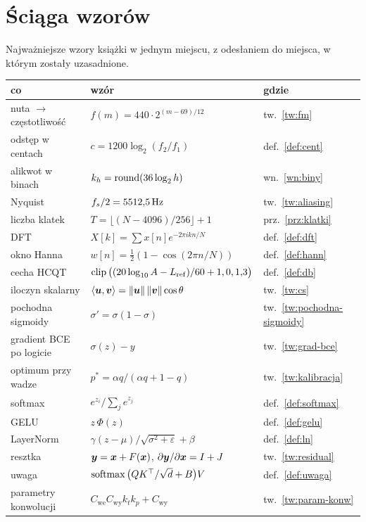 \chapter{Ściąga wzorów}\label{dod:sciaga}

Najważniejsze wzory książki w jednym miejscu, z odesłaniem do miejsca, w którym zostały uzasadnione.

\begin{table}[ht]
\centering\small
\begin{tabular}{@{}p{3.6cm}p{6.4cm}p{1.4cm}@{}}
\toprule
co & wzór & gdzie\\
\midrule
nuta $\to$ częstotliwość & $f(m)=440\cdot2^{(m-69)/12}$ & tw.~\ref{tw:fm}\\
odstęp w centach & $c=1200\log_2(f_2/f_1)$ & def.~\ref{def:cent}\\
alikwot w binach & $k_h=\operatorname{round}(36\log_2h)$ & wn.~\ref{wn:biny}\\
Nyquist & $f_s/2=5512{,}5\,\mathrm{Hz}$ & tw.~\ref{tw:aliasing}\\
liczba klatek & $T=\lfloor(N-4096)/256\rfloor+1$ & prz.~\ref{prz:klatki}\\
DFT & $X[k]=\sum x[n]e^{-2\pi ikn/N}$ & def.~\ref{def:dft}\\
okno Hanna & $w[n]=\tfrac12(1-\cos(2\pi n/N))$ & def.~\ref{def:hann}\\
cecha HCQT & $\operatorname{clip}\big((20\log_{10}A-L_\mathrm{ref})/60+1,0,1{,}3\big)$ & def.~\ref{def:db}\\
iloczyn skalarny & $\left\langle \bm{u},\bm{v}\right\rangle=\left\lVert \bm{u}\right\rVert\left\lVert \bm{v}\right\rVert\cos\theta$ & tw.~\ref{tw:cs}\\
pochodna sigmoidy & $\sigma'=\sigma(1-\sigma)$ & tw.~\ref{tw:pochodna-sigmoidy}\\
gradient BCE po logicie & $\sigma(z)-y$ & tw.~\ref{tw:grad-bce}\\
optimum przy wadze & $p^\ast=\alpha q/(\alpha q+1-q)$ & tw.~\ref{tw:kalibracja}\\
softmax & $e^{z_i}/\sum_je^{z_j}$ & def.~\ref{def:softmax}\\
GELU & $z\,\Phi(z)$ & def.~\ref{def:gelu}\\
LayerNorm & $\gamma(z-\mu)/\sqrt{\sigma^2+\varepsilon}+\beta$ & def.~\ref{def:ln}\\
resztka & $\bm{y}=\bm{x}+F(\bm{x})$, $\partial\bm{y}/\partial\bm{x}=I+J$ & tw.~\ref{tw:residual}\\
uwaga & $\operatorname{softmax}\big(QK^\top/\sqrt d+B\big)V$ & def.~\ref{def:uwaga}\\
parametry konwolucji & $C_\mathrm{we}C_\mathrm{wy}k_tk_p+C_\mathrm{wy}$ & tw.~\ref{tw:param-konw}\\

\end{tabular}
\end{table}

